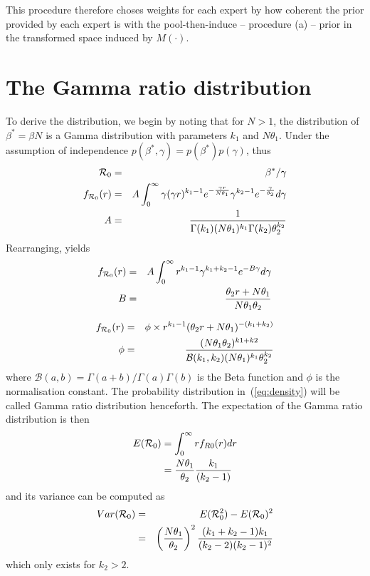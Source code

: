\documentclass[11pt]{article}
\begin{document}
This procedure therefore choses weights for each expert by how coherent the prior provided by each expert is with the pool-then-induce -- procedure (a) -- prior in the transformed space induced by $M(\cdot)$.
\section{The Gamma ratio distribution}

To derive the distribution, we begin by noting that for $N > 1$, the distribution of $\beta^{\ast} = \beta N$ is a Gamma distribution with parameters $k_1$ and $N\theta_1$.
Under the assumption of independence $p(\beta^{\ast}, \gamma) = p(\beta^{\ast})p(\gamma)$, thus
\begin{eqnarray}
{\cal R}_0 &=& \beta^{\ast}/\gamma\\
f_{{\cal R}_0}(r) &=& A \int_{0}^{\infty} \gamma(\gamma r)^{k_1 -1} e^{-\frac{\gamma r}{N\theta_1}} \gamma^{k_2 -1} e^{-\frac{\gamma}{\theta_2}} d\gamma \\
A &=& \frac{1}{\Gamma(k_1)(N\theta_1)^{k_1}\Gamma(k_2)\theta_2^{k_2}}
\end{eqnarray}
Rearranging, yields
\begin{eqnarray}
\label{eq:toint}
f_{{\cal R}_0}(r) &=& A \int_{0}^{\infty} r^{k_1 -1} \gamma^{k_1 + k_2 -1} e^{-B\gamma} d\gamma \\
        B  &=& \frac{\theta_2 r + N\theta_1}{N\theta_1\theta_2}
\end{eqnarray}

\begin{eqnarray}
\label{eq:density}
f_{{\cal R}_0}(r) &=& \phi\times\space r^{k_1-1} (\theta_2 r + N\theta_1)^{-(k_1 + k_2)} \\
\label{eq:normconst}
\phi &=&  \frac{(N\theta_1\theta_2)^{k1+k2}}{\mathcal{B}(k_1, k_2)(N\theta_1)^{k_1}\theta_2^{k_2} }
\end{eqnarray}
where $\mathcal{B}(a, b) = \Gamma(a + b)/\Gamma(a)\Gamma(b)$ is the Beta function  and $\phi$ is the normalisation constant.
The probability distribution in~(\ref{eq:density}) will be called Gamma ratio distribution henceforth.
The expectation of the Gamma ratio distribution is then
\begin{align}
\label{eq:expR0}
E({\cal R}_0) &= \int_{0}^{\infty}rf_{R0}(r)dr \\
       &= \frac{N\theta_1}{\theta_2}\frac{k_1}{(k_2-1)}
\end{align}
and its variance can be computed as
\begin{eqnarray}
\label{eq:var1}
Var({\cal R}_0) &=& E({\cal R}_0^2) - E({\cal R}_0)^2  \\
\label{eq:var2}
 &=& \left(\frac{N\theta_1}{\theta_2}\right)^2\frac{(k_1+k_2-1)k_1}{(k_2-2)(k_2-1)^2}
\end{eqnarray}
which only exists for $k_2 > 2$.
\end{document}
